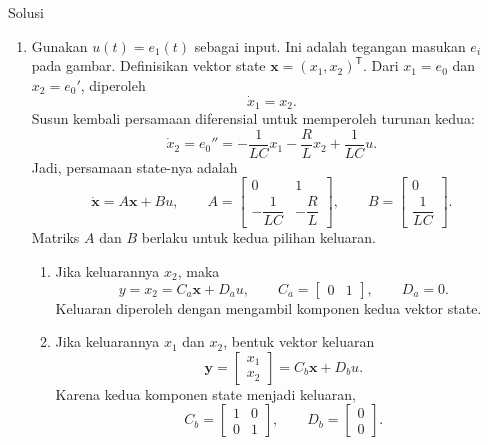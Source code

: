 \documentclass[11pt,a4paper]{article}
\newcommand{\xx}{\mathbf{x}}
\begin{document}
\begin{center}
  Solusi
\end{center}
\begin{enumerate}[itemsep=12pt,parsep=5pt]
  \item Gunakan $u(t)=e_1(t)$ sebagai input.
        Ini adalah tegangan masukan $e_i$ pada gambar.
        Definisikan vektor state $\xx=(x_1,x_2)^{\mathsf T}$.
        Dari $x_1=e_0$ dan $x_2=e_0'$, diperoleh
        \[
          \dot{x}_1=x_2.
        \]
        Susun kembali persamaan diferensial untuk memperoleh turunan kedua:
        \[
          \dot{x}_2=e_0''
          =-\frac{1}{LC}x_1-\frac{R}{L}x_2+\frac{1}{LC}u.
        \]
        Jadi, persamaan state-nya adalah
        \[
          \dot{\xx}=A\xx+Bu,\qquad
          A=\begin{bmatrix}0&1\\-\dfrac{1}{LC}&-\dfrac{R}{L}\end{bmatrix},
          \qquad B=\begin{bmatrix}0\\\dfrac{1}{LC}\end{bmatrix}.
        \]
        Matriks $A$ dan $B$ berlaku untuk kedua pilihan keluaran.
        \begin{enumerate}
          \item Jika keluarannya $x_2$, maka
                \[
                  y=x_2=C_a\xx+D_a u,\qquad
                  C_a=\begin{bmatrix}0&1\end{bmatrix},\qquad D_a=0.
                \]
                Keluaran diperoleh dengan mengambil komponen kedua vektor state.

          \item Jika keluarannya $x_1$ dan $x_2$, bentuk vektor keluaran
                \[
                  \mathbf{y}=\begin{bmatrix}x_1\\x_2\end{bmatrix}
                  =C_b\xx+D_bu.
                \]
                Karena kedua komponen state menjadi keluaran,
                \[
                  C_b=\begin{bmatrix}1&0\\0&1\end{bmatrix},\qquad
                  D_b=\begin{bmatrix}0\\0\end{bmatrix}.
                \]
        \end{enumerate}


\end{enumerate}
\end{document}
